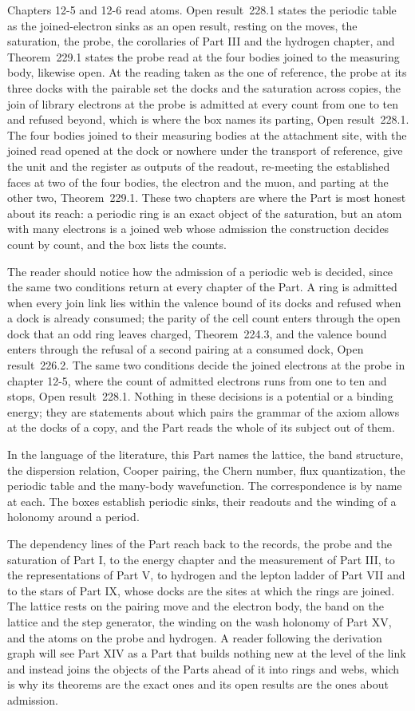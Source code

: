 Chapters 12-5 and 12-6 read atoms. Open result~228.1 states the periodic table as the joined-electron sinks as an open result, resting on the moves, the saturation, the probe, the corollaries of Part III and the hydrogen chapter, and Theorem~229.1 states the probe read at the four bodies joined to the measuring body, likewise open. At the reading taken as the one of reference, the probe at its three docks with the pairable set the docks and the saturation across copies, the join of library electrons at the probe is admitted at every count from one to ten and refused beyond, which is where the box names its parting, Open result~228.1. The four bodies joined to their measuring bodies at the attachment site, with the joined read opened at the dock or nowhere under the transport of reference, give the unit and the register as outputs of the readout, re-meeting the established faces at two of the four bodies, the electron and the muon, and parting at the other two, Theorem~229.1. These two chapters are where the Part is most honest about its reach: a periodic ring is an exact object of the saturation, but an atom with many electrons is a joined web whose admission the construction decides count by count, and the box lists the counts.

The reader should notice how the admission of a periodic web is decided, since the same two conditions return at every chapter of the Part. A ring is admitted when every join link lies within the valence bound of its docks and refused when a dock is already consumed; the parity of the cell count enters through the open dock that an odd ring leaves charged, Theorem~224.3, and the valence bound enters through the refusal of a second pairing at a consumed dock, Open result~226.2. The same two conditions decide the joined electrons at the probe in chapter 12-5, where the count of admitted electrons runs from one to ten and stops, Open result~228.1. Nothing in these decisions is a potential or a binding energy; they are statements about which pairs the grammar of the axiom allows at the docks of a copy, and the Part reads the whole of its subject out of them.

In the language of the literature, this Part names the lattice, the band structure, the dispersion relation, Cooper pairing, the Chern number, flux quantization, the periodic table and the many-body wavefunction. The correspondence is by name at each. The boxes establish periodic sinks, their readouts and the winding of a holonomy around a period.

The dependency lines of the Part reach back to the records, the probe and the saturation of Part I, to the energy chapter and the measurement of Part III, to the representations of Part V, to hydrogen and the lepton ladder of Part VII and to the stars of Part IX, whose docks are the sites at which the rings are joined. The lattice rests on the pairing move and the electron body, the band on the lattice and the step generator, the winding on the wash holonomy of Part XV, and the atoms on the probe and hydrogen. A reader following the derivation graph will see Part XIV as a Part that builds nothing new at the level of the link and instead joins the objects of the Parts ahead of it into rings and webs, which is why its theorems are the exact ones and its open results are the ones about admission.
